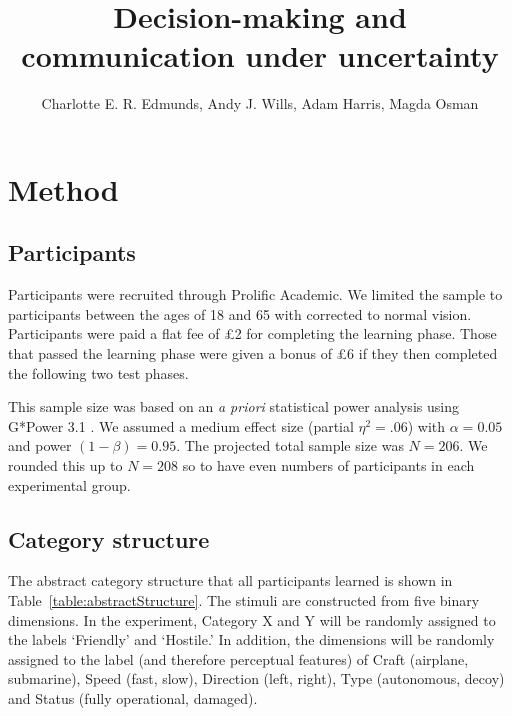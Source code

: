 \documentclass[doc, a4paper, apacite]{apa6}
\title{Decision-making and communication under uncertainty}
\author{Charlotte E. R. Edmunds, Andy J. Wills, Adam Harris, Magda Osman}
\affiliation{Queen Mary, UCL, University of London \\ 11 January 2021}
\begin{document}
\maketitle
	\doublespacing
	
\section{Method}

\subsection{Participants}
Participants were recruited through Prolific Academic.
We limited the sample to participants between the ages of 18 and 65 with corrected to normal vision. 
Participants were paid a flat fee of \pounds 2 for completing the learning phase.
Those that passed the learning phase were given a bonus of \pounds 6 if they then completed the following two test phases. 

This sample size was based on an \emph{a priori} statistical power analysis using G*Power 3.1 \cite{GPower2007, GPower2009}. 
We assumed a medium effect size (partial $\eta^2 = .06$) with $\alpha=0.05$ and power $(1-\beta)= 0.95$.
The projected total sample size was $N=206$.
We rounded this up to $N=208$ so to have even numbers of participants in each experimental group. 

\subsection{Category structure}
The abstract category structure that all participants learned is shown in Table~\ref{table:abstractStructure}. 
The stimuli are constructed from five binary dimensions. 
In the experiment, Category X and Y will be randomly assigned to the labels `Friendly' and `Hostile.' 
In addition, the dimensions will be randomly assigned to the label (and therefore perceptual features) of Craft (airplane, submarine), Speed (fast, slow), Direction (left, right), Type (autonomous, decoy) and Status (fully operational, damaged). 
\end{document}
